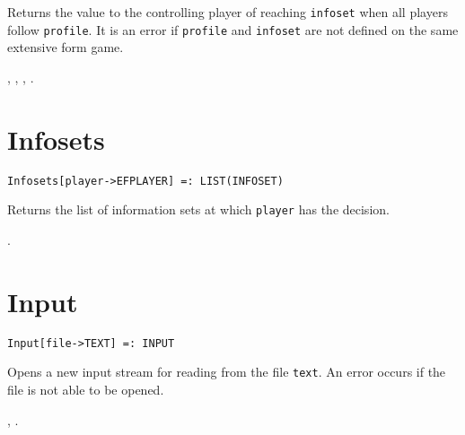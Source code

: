 \noindent
Returns the value to the controlling player of reaching \verb+infoset+
when all players follow \verb+profile+.  It is an error if
\verb+profile+ and \verb+infoset+ are not defined on the same
extensive form game.

\seealso
{},
,
,
.


\section*{Infosets}\label{PrimInfosets}
\begin{verbatim}
Infosets[player->EFPLAYER] =: LIST(INFOSET) 
\end{verbatim}

\noindent
Returns the list of information sets at which \verb+player+ has the
decision.

\seealso {}.


\section*{Input}\label{PrimInput}
\begin{verbatim}
Input[file->TEXT] =: INPUT 
\end{verbatim}

\noindent
Opens a new input stream for reading from the file \verb+text+.  An
error occurs if the file is not able to be opened.

\seealso {}, .





